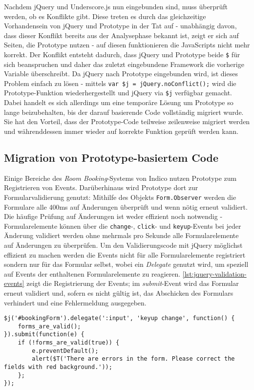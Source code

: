Nachdem jQuery und Underscore.js nun eingebunden sind, muss überprüft werden, ob es Konflikte gibt.
Diese treten es durch das gleichzeitige Vorhandensein von jQuery und Prototype in der Tat auf - unabhängig
davon, dass dieser Konflikt bereits aus der Analysephase bekannt ist, zeigt er sich auf Seiten, die
Prototype nutzen - auf diesen funktionieren die JavaScripts nicht mehr korrekt. Der Konflikt
entsteht dadurch, dass jQuery und Prototype beide \lstinline{$} für sich beanspruchen und daher das
zuletzt eingebundene Framework die vorherige Variable überschreibt. Da jQuery nach Prototype
eingebunden wird, ist dieses Problem einfach zu lösen - mittels
\lstinline{var $j = jQuery.noConflict();} wird die Prototype-Funktion wiederhergestellt und jQuery
via \lstinline{$j} verfügbar gemacht. Dabei handelt es sich allerdings um eine temporäre Lösung um
Prototype so lange beizubehalten, bis der darauf basierende Code vollständig migriert wurde. Sie hat
den Vorteil, dass der Prototype-Code teilweise zeilenweise migriert werden und währenddessen immer
wieder auf korrekte Funktion geprüft werden kann.

\subsection{Migration von Prototype-basiertem Code}

Einige Bereiche des \emph{Room Booking}-Systems von Indico nutzen Prototype zum Registrieren von
Events. Darüberhinaus wird Prototype dort zur Formularvalidierung genutzt: Mithilfe des Objekts
\lstinline{Form.Observer} werden die Formulare alle 400ms auf Änderungen überprüft und wenn nötig
erneut validiert. Die häufige Prüfung auf Änderungen ist weder effizient noch notwendig -
Formularelemente können über die \lstinline{change}-, \lstinline{click}- und
\lstinline{keyup}-Events bei jeder Änderung validiert werden ohne mehrmals pro Sekunde alle
Formularelemente auf Änderungen zu überprüfen. Um den Validierungscode mit jQuery möglichst
effizient zu machen werden die Events nicht für alle Formularelemente registriert sondern nur für
das Formular selbst, wobei ein \emph{Delegate} genutzt wird, um speziell auf Events der enthaltenen
Formularelemente zu reagieren. \autoref{lst:jquery-validation-events} zeigt die Registrierung der
Events; im \emph{submit}-Event wird das Formular erneut validiert und, sofern es nicht gültig ist,
das Abschicken des Formulars verhindert und eine Fehlermeldung ausgegeben.

\begin{lstlisting}[caption=Formularvalidierung via jQuery,label=lst:jquery-validation-events]
$j('#bookingForm').delegate(':input', 'keyup change', function() {
    forms_are_valid();
}).submit(function(e) {
    if (!forms_are_valid(true)) {
        e.preventDefault();
        alert($T('There are errors in the form. Please correct the fields with red background.'));
    };
});
\end{lstlisting}

